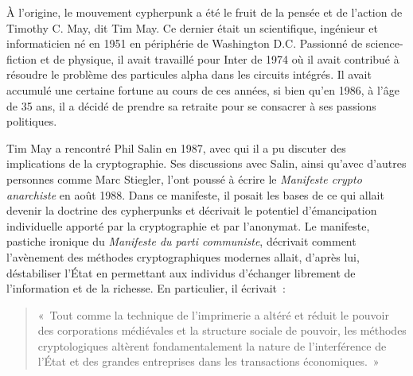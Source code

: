 À l'origine, le mouvement cypherpunk a été le fruit de la pensée et de l'action de Timothy C. May, dit Tim May. Ce dernier était un scientifique, ingénieur et informaticien né en 1951 en périphérie de Washington D.C. Passionné de science-fiction et de physique, il avait travaillé pour Inter de 1974 où il avait contribué à résoudre le problème des particules alpha dans les circuits intégrés. Il avait accumulé une certaine fortune au cours de ces années, si bien qu'en 1986, à l'âge de 35 ans, il a décidé de prendre sa retraite pour se consacrer à ses passions politiques.

Tim May a rencontré Phil Salin en 1987, avec qui il a pu discuter des implications de la cryptographie. Ses discussions avec Salin, ainsi qu'avec d'autres personnes comme Marc Stiegler, l'ont poussé à écrire le \emph{Manifeste crypto anarchiste} en août 1988. Dans ce manifeste, il posait les bases de ce qui allait devenir la doctrine des cypherpunks et décrivait le potentiel d'émancipation individuelle apporté par la cryptographie et par l'anonymat. Le manifeste, pastiche ironique du \emph{Manifeste du parti communiste}, décrivait comment l'avènement des méthodes cryptographiques modernes allait, d'après lui, déstabiliser l'État en permettant aux individus d'échanger librement de l'information et de la richesse. En particulier, il écrivait~: %

\begin{quote}
«~Tout comme la technique de l'imprimerie a altéré et réduit le pouvoir des corporations médiévales et la structure sociale de pouvoir, les méthodes cryptologiques altèrent fondamentalement la nature de l'interférence de l'État et des grandes entreprises dans les transactions économiques.~»
\end{quote} %

